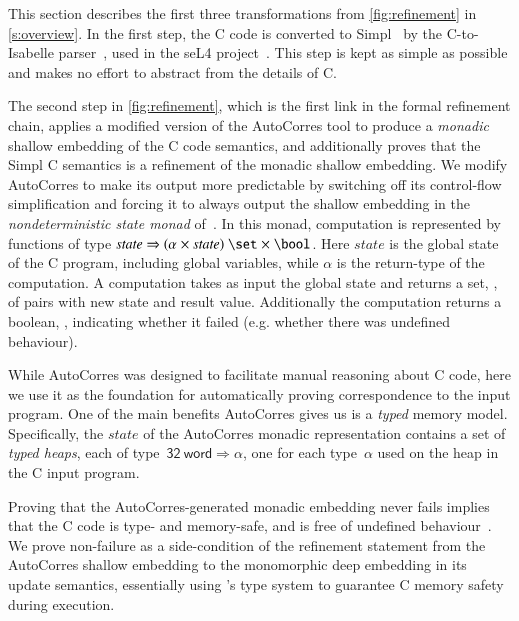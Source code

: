 \documentclass[9pt\ifFinal\else,preprint,nocopyrightspace\fi,\ifAlpha\else natbib,authoryear\fi]{sigplanconf}
\begin{document}
This section describes the first three transformations from
\autoref{fig:refinement} in \autoref{s:overview}. In the first step, the C
code is converted to Simpl~\citep{schirmer:phd} by the C-to-Isabelle
parser~\citep{Tuch_KN_07}, used in the seL4
project~\citep{Klein_EHACDEEKNSTW_09}. This step is kept as simple as
possible and makes no effort to abstract from the details of C.



\newcommand{\state}{\mathit{state}}
The second step in \autoref{fig:refinement}, which is the first link in the formal refinement chain, applies a modified version of the AutoCorres tool to produce a \emph{monadic} shallow embedding of the C code
semantics, and additionally proves that the Simpl C semantics is
a refinement of the monadic shallow embedding. We modify AutoCorres to make
its output more predictable by switching off its control-flow
simplification and forcing it to always output the shallow embedding in
the \emph{nondeterministic state monad} of~\citet{Cock_KS_08}.
In this monad, computation is represented by functions of type
$\state \Rightarrow (\alpha \mathrel{\times} \state) \;\set \mathrel{\times} \bool$. Here
$\state$ is the global state of the C program, including
global variables, while $\alpha$ is the return-type of the computation.
A computation takes as input the global state and returns a set, \results, of pairs with new state and result value. Additionally the computation
returns a boolean, \failed, indicating whether it failed (e.g. whether there was undefined behaviour). 

\newcommand{\word}{\mathsf{word}}
While AutoCorres was designed to facilitate manual reasoning about C code,
here we use it as the foundation for automatically proving correspondence to
the \CDSL input program. One of the main benefits AutoCorres gives us is a
\emph{typed} memory model. Specifically, the $\state$ of the AutoCorres monadic
representation contains a set of \emph{typed heaps}, each of type~$\mathsf{32}\  \word \Rightarrow \alpha$, 
one for each type~$\alpha$ used on the heap in the C input program. 

Proving that the
AutoCorres-generated monadic embedding never fails implies that the C
code is type- and memory-safe, and is free of undefined behaviour~\citep{Greenaway_LAK_14}. We prove
non-failure as a side-condition of the refinement statement from the
AutoCorres shallow embedding to the \CDSL monomorphic deep embedding in its
update semantics, essentially using \CDSL's type system to guarantee C memory
safety during execution.
\end{document}
